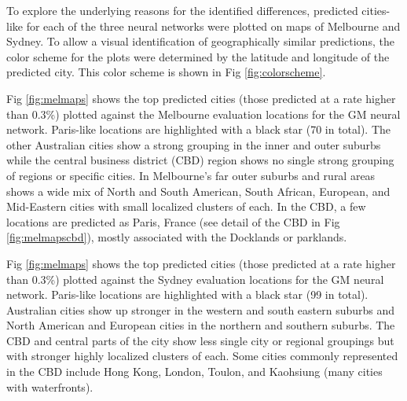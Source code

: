 \documentclass[10pt,letterpaper]{article}
\begin{document}
To explore the underlying reasons for the identified differences, predicted cities-like for each of the three neural networks were plotted on maps of Melbourne and Sydney. To allow a visual identification of geographically similar predictions, the color scheme for the plots were determined by the latitude and longitude of the predicted city. This color scheme is shown in Fig \ref{fig:colorscheme}. 




Fig \ref{fig:melmaps} shows the top predicted cities (those predicted at a rate higher than 0.3\%) plotted against the Melbourne evaluation locations for the GM neural network. Paris-like locations are highlighted with a black star (70 in total). The other Australian cities show a strong grouping in the inner and outer suburbs while the central business district (CBD) region shows no single strong grouping of regions or specific cities. In Melbourne's far outer suburbs and rural areas shows a wide mix of North and South American, South African, European, and Mid-Eastern cities with small localized clusters of each. In the CBD, a few locations are predicted as Paris, France (see detail of the CBD in Fig \ref{fig:melmapscbd}), mostly associated with the Docklands or parklands.

Fig \ref{fig:melmaps} shows the top predicted cities (those predicted at a rate higher than 0.3\%) plotted against the Sydney evaluation locations for the GM neural network. Paris-like locations are highlighted with a black star (99 in total).  Australian cities show up stronger in the western and south eastern suburbs and North American and European cities in the northern and southern suburbs. The CBD and central parts of the city show less single city or regional groupings but with stronger highly localized clusters of each. Some cities commonly represented in the CBD include Hong Kong, London, Toulon, and Kaohsiung (many cities with waterfronts). 


%
\end{document}
